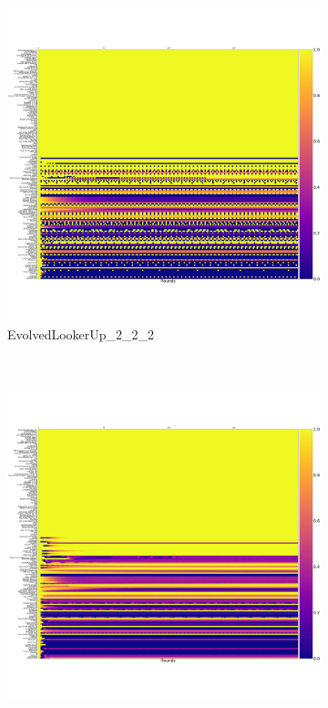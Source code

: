 \documentclass{article}
\begin{document}
\begin{figure}[!hbtp]
    \centering
    \begin{subfigure}[t]{.3\textwidth}
        \centering
        \includegraphics[width=\textwidth]{./assets/cooperation_0_0_10000_EvolvedLookerUp2_2_2_array.pdf}
        \caption{EvolvedLookerUp\_2\_2\_2}
    \end{subfigure}%
    ~
    \begin{subfigure}[t]{.3\textwidth}
        \centering
        \includegraphics[width=\textwidth]{./assets/cooperation_0_0_10000_Evolved_HMM_5_array.pdf}

\end{subfigure}
\end{figure}
\end{document}
